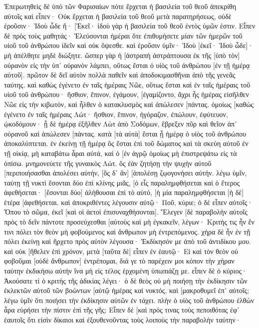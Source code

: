 Ἐπερωτηθεὶς δὲ ὑπὸ τῶν Φαρισαίων πότε ἔρχεται ἡ βασιλεία τοῦ θεοῦ ἀπεκρίθη αὐτοῖς καὶ εἶπεν· Οὐκ ἔρχεται ἡ βασιλεία τοῦ θεοῦ μετὰ παρατηρήσεως, 
οὐδὲ ἐροῦσιν· Ἰδοὺ ὧδε ἤ· [Ἐκεῖ· ἰδοὺ γὰρ ἡ βασιλεία τοῦ θεοῦ ἐντὸς ὑμῶν ἐστιν. 
Εἶπεν δὲ πρὸς τοὺς μαθητάς· Ἐλεύσονται ἡμέραι ὅτε ἐπιθυμήσετε μίαν τῶν ἡμερῶν τοῦ υἱοῦ τοῦ ἀνθρώπου ἰδεῖν καὶ οὐκ ὄψεσθε. 
καὶ ἐροῦσιν ὑμῖν· Ἰδοὺ [ἐκεῖ· Ἰδοὺ ὧδε]· μὴ ἀπέλθητε μηδὲ διώξητε. 
ὥσπερ γὰρ ἡ [ἀστραπὴ ἀστράπτουσα ἐκ τῆς [ὑπὸ τὸν] οὐρανὸν εἰς τὴν ὑπ᾽ οὐρανὸν λάμπει, οὕτως ἔσται ὁ υἱὸς τοῦ ἀνθρώπου [ἐν τῇ ἡμέρᾳ αὐτοῦ]. 
πρῶτον δὲ δεῖ αὐτὸν πολλὰ παθεῖν καὶ ἀποδοκιμασθῆναι ἀπὸ τῆς γενεᾶς ταύτης. 
καὶ καθὼς ἐγένετο ἐν ταῖς ἡμέραις Νῶε, οὕτως ἔσται καὶ ἐν ταῖς ἡμέραις τοῦ υἱοῦ τοῦ ἀνθρώπου· 
ἤσθιον, ἔπινον, ἐγάμουν, [ἐγαμίζοντο, ἄχρι ἧς ἡμέρας εἰσῆλθεν Νῶε εἰς τὴν κιβωτόν, καὶ ἦλθεν ὁ κατακλυσμὸς καὶ ἀπώλεσεν [πάντας. 
ὁμοίως [καθὼς ἐγένετο ἐν ταῖς ἡμέραις Λώτ· ἤσθιον, ἔπινον, ἠγόραζον, ἐπώλουν, ἐφύτευον, ᾠκοδόμουν· 
ᾗ δὲ ἡμέρᾳ ἐξῆλθεν Λὼτ ἀπὸ Σοδόμων, ἔβρεξεν πῦρ καὶ θεῖον ἀπ᾽ οὐρανοῦ καὶ ἀπώλεσεν [πάντας. 
κατὰ [τὰ αὐτὰ] ἔσται ᾗ ἡμέρᾳ ὁ υἱὸς τοῦ ἀνθρώπου ἀποκαλύπτεται. 
ἐν ἐκείνῃ τῇ ἡμέρᾳ ὃς ἔσται ἐπὶ τοῦ δώματος καὶ τὰ σκεύη αὐτοῦ ἐν τῇ οἰκίᾳ, μὴ καταβάτω ἆραι αὐτά, καὶ ὁ [ἐν ἀγρῷ ὁμοίως μὴ ἐπιστρεψάτω εἰς τὰ ὀπίσω. 
μνημονεύετε τῆς γυναικὸς Λώτ. 
ὃς ἐὰν ζητήσῃ τὴν ψυχὴν αὐτοῦ [περιποιήσασθαι ἀπολέσει αὐτήν, [ὃς δ᾽ ἂν] [ἀπολέσῃ ζῳογονήσει αὐτήν. 
λέγω ὑμῖν, ταύτῃ τῇ νυκτὶ ἔσονται δύο ἐπὶ κλίνης μιᾶς, [ὁ εἷς παραλημφθήσεται καὶ ὁ ἕτερος ἀφεθήσεται· 
[ἔσονται δύο] ἀλήθουσαι ἐπὶ τὸ αὐτό, [ἡ μία παραλημφθήσεται [ἡ δὲ] ἑτέρα [ἀφεθήσεται. 
καὶ ἀποκριθέντες λέγουσιν αὐτῷ· Ποῦ, κύριε; ὁ δὲ εἶπεν αὐτοῖς· Ὅπου τὸ σῶμα, ἐκεῖ [καὶ οἱ ἀετοὶ ἐπισυναχθήσονται]. 
Ἔλεγεν [δὲ παραβολὴν αὐτοῖς πρὸς τὸ δεῖν πάντοτε προσεύχεσθαι [αὐτοὺς καὶ μὴ ἐγκακεῖν, 
λέγων· Κριτής τις ἦν ἔν τινι πόλει τὸν θεὸν μὴ φοβούμενος καὶ ἄνθρωπον μὴ ἐντρεπόμενος. 
χήρα δὲ ἦν ἐν τῇ πόλει ἐκείνῃ καὶ ἤρχετο πρὸς αὐτὸν λέγουσα· Ἐκδίκησόν με ἀπὸ τοῦ ἀντιδίκου μου. 
καὶ οὐκ [ἤθελεν ἐπὶ χρόνον, μετὰ [ταῦτα δὲ] εἶπεν ἐν ἑαυτῷ· Εἰ καὶ τὸν θεὸν οὐ φοβοῦμαι [οὐδὲ ἄνθρωπον] ἐντρέπομαι, 
διά γε τὸ παρέχειν μοι κόπον τὴν χήραν ταύτην ἐκδικήσω αὐτήν ἵνα μὴ εἰς τέλος ἐρχομένη ὑπωπιάζῃ με. 
εἶπεν δὲ ὁ κύριος· Ἀκούσατε τί ὁ κριτὴς τῆς ἀδικίας λέγει· 
ὁ δὲ θεὸς οὐ μὴ ποιήσῃ τὴν ἐκδίκησιν τῶν ἐκλεκτῶν αὐτοῦ τῶν βοώντων [αὐτῷ ἡμέρας καὶ νυκτός, καὶ [μακροθυμεῖ ἐπ᾽ αὐτοῖς; 
λέγω ὑμῖν ὅτι ποιήσει τὴν ἐκδίκησιν αὐτῶν ἐν τάχει. πλὴν ὁ υἱὸς τοῦ ἀνθρώπου ἐλθὼν ἆρα εὑρήσει τὴν πίστιν ἐπὶ τῆς γῆς; 
Εἶπεν δὲ [καὶ πρός τινας τοὺς πεποιθότας ἐφ᾽ ἑαυτοῖς ὅτι εἰσὶν δίκαιοι καὶ ἐξουθενοῦντας τοὺς λοιποὺς τὴν παραβολὴν ταύτην· 
